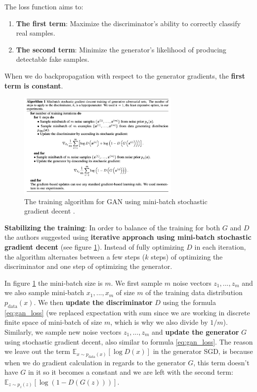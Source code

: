The loss function aims to:

\begin{enumerate}
    \item \textbf{The first term}: Maximize the discriminator's ability to correctly classify real samples.
    \item \textbf{The second term}: Minimize the generator's likelihood of producing detectable fake samples.
\end{enumerate}

When we do backpropagation with respect to the generator gradients, the \textbf{first term is constant}.

\begin{figure}
    \centering
    \includegraphics[width=0.7\textwidth]{images/gan/gan_training.png}
    \caption{The training algorithm for GAN using mini-batch stochastic gradient decent \cite{gan}.}
    \label{fig:gan_training}
\end{figure}

\textbf{Stabilizing the training}: In order to balance of the training for both $G$ and $D$ the authors suggested using \textbf{iterative approach using mini-batch stochastic gradient decent} (see figure \ref{fig:gan_training}). Instead of fully optimizing $D$ in each iteration, the algorithm alternates between a few steps ($k$ steps) of optimizing the discriminator and one step of optimizing the generator.

In figure \ref{fig:gan_training} the mini-batch size is $m$. We first sample $m$ noise vectors $z_1, ..., z_m$ and we also sample mini-batch $x_1, ..., x_m$ of size $m$ of the training data distribution $p_\text{data} (x)$. We then \textbf{update the discriminator} $D$ using the formula \ref{eq:gan_loss} (we replaced expectation with sum since we are working in discrete finite space of mini-batch of size $m$, which is why we also divide by $1/m$). Similarly, we sample new noise vectors $z_1, ..., z_m$ and \textbf{update the generator} $G$ using stochastic gradient decent, also similar to formula \ref{eq:gan_loss}. The reason we leave out the term $\mathbb{E}_{x \sim p_{\text{data}}(x)}[\log D(x)]$ in the generator SGD, is because when we do gradient calculation in regards to the generator $G$, this term doesn't have $G$ in it so it becomes a constant and we are left with the second term: $\mathbb{E}_{z \sim p_z(z)}[\log(1 - D(G(z)))]$.

